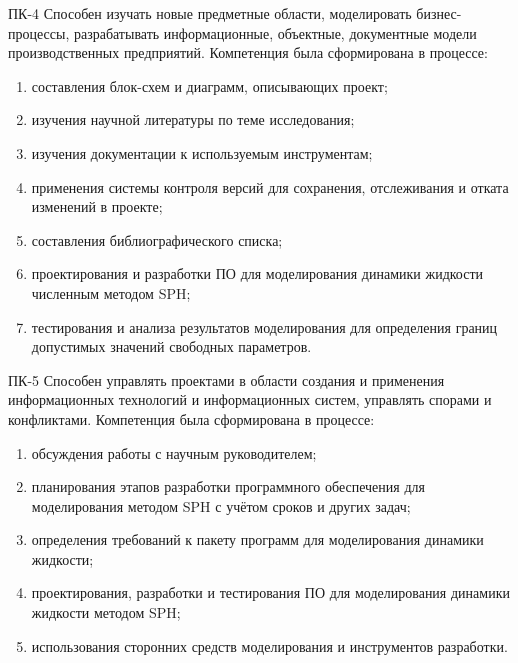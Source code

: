 ПК-4 Способен изучать новые предметные области, моделировать бизнес-процессы, 
разрабатывать информационные, объектные, документные модели производственных предприятий.
Компетенция была сформирована в процессе:
\begin{enumerate}
    \item составления блок-схем и диаграмм, описывающих проект;
    \item изучения научной литературы по теме исследования;
    \item изучения документации к используемым инструментам;
    \item применения системы контроля версий для сохранения, отслеживания и отката изменений в проекте;
    \item составления библиографического списка;
    \item проектирования и разработки ПО для моделирования динамики жидкости численным методом SPH;
    \item тестирования и анализа результатов моделирования для определения границ допустимых значений свободных параметров.
\end{enumerate}

ПК-5 Способен управлять проектами в области создания и применения информационных технологий и информационных систем, 
управлять спорами и конфликтами.
Компетенция была сформирована в процессе:
\begin{enumerate}
    \item обсуждения работы с научным руководителем;
    \item планирования этапов разработки программного обеспечения для моделирования методом SPH с учётом сроков и других задач;
    \item определения требований к пакету программ для моделирования динамики жидкости;
    \item проектирования, разработки и тестирования ПО для моделирования динамики жидкости методом SPH;
    \item использования сторонних средств моделирования и инструментов разработки.
\end{enumerate}
